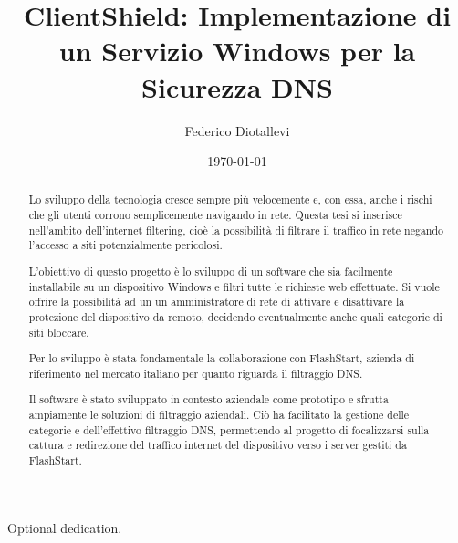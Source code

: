 \documentclass[12pt,a4paper,openright,twoside]{book}
\title{ClientShield: Implementazione di un Servizio Windows per la Sicurezza DNS}
\author{Federico Diotallevi}
\date{\today}
\begin{document}
\frontmatter\frontispiece\

\renewcommand{\abstractname}{Sommario}
\begin{abstract}

Lo sviluppo della tecnologia cresce sempre più velocemente e, con essa, anche i rischi che gli utenti corrono semplicemente navigando in rete.
Questa tesi si inserisce nell'ambito dell'internet filtering, cioè la possibilità di filtrare il traffico in rete negando l'accesso a siti potenzialmente pericolosi.

L'obiettivo di questo progetto è lo sviluppo di un software che sia facilmente installabile su un dispositivo Windows e filtri tutte le richieste web effettuate.
Si vuole offrire la possibilità ad un un amministratore di rete di attivare e disattivare la protezione del dispositivo da remoto, decidendo eventualmente anche quali categorie di siti bloccare.

Per lo sviluppo è stata fondamentale la collaborazione con FlashStart, azienda di riferimento nel mercato italiano per quanto riguarda il filtraggio \gls{DNS}.

Il software è stato sviluppato in contesto aziendale come prototipo e sfrutta ampiamente le soluzioni di filtraggio aziendali.
Ciò ha facilitato la gestione delle categorie e dell'effettivo filtraggio \gls{DNS}, permettendo al progetto di focalizzarsi sulla cattura e redirezione del traffico internet del dispositivo verso i server gestiti da FlashStart.
\end{abstract}

\begin{dedication}
Optional dedication.
\end{dedication}

\tableofcontents   



\phantom{Introduzione}
\label{chap:introduzione}
\end{document}

